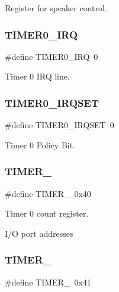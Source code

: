 Register for speaker control. 

\hypertarget{group__i8254_ga30bf84c312af248cb81bb224e09f9ba8}{}\label{group__i8254_ga30bf84c312af248cb81bb224e09f9ba8} 
\subsubsection{\texorpdfstring{T\+I\+M\+E\+R0\+\_\+\+I\+RQ}{TIMER0\_IRQ}}
{\footnotesize\ttfamily \#define T\+I\+M\+E\+R0\+\_\+\+I\+RQ~0}



Timer 0 I\+RQ line. 

\hypertarget{group__i8254_ga5a49703fe985c8df41c3be0ed091ac45}{}\label{group__i8254_ga5a49703fe985c8df41c3be0ed091ac45} 
\subsubsection{\texorpdfstring{T\+I\+M\+E\+R0\+\_\+\+I\+R\+Q\+S\+ET}{TIMER0\_IRQSET}}
{\footnotesize\ttfamily \#define T\+I\+M\+E\+R0\+\_\+\+I\+R\+Q\+S\+ET~0}



Timer 0 Policy Bit. 

\hypertarget{group__i8254_gacc9ff9df4a9674a1ce9ba08fc4a4679e}{}\label{group__i8254_gacc9ff9df4a9674a1ce9ba08fc4a4679e} 
\subsubsection{\texorpdfstring{T\+I\+M\+E\+R\+\_}{TIMER\_0}}
{\footnotesize\ttfamily \#define T\+I\+M\+E\+R\+\_~0x40}



Timer 0 count register. 

I/O port addresses \hypertarget{group__i8254_gac62c99c2a9289891c1b83052242cca49}{}\label{group__i8254_gac62c99c2a9289891c1b83052242cca49} 
\subsubsection{\texorpdfstring{T\+I\+M\+E\+R\+\_}{TIMER\_1}}
{\footnotesize\ttfamily \#define T\+I\+M\+E\+R\+\_~0x41}



